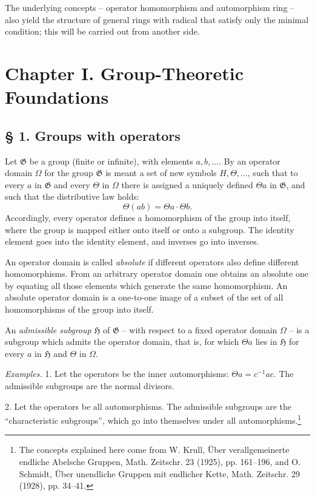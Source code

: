 \documentclass[11pt]{article}
\providecommand{\mG}{\mathfrak{G}}
\providecommand{\mH}{\mathfrak{H}}
\begin{document}
The underlying concepts -- operator homomorphism and automorphism ring -- also yield the structure of general rings with radical that satisfy only the minimal condition; this will be carried out from another side.

\section*{Chapter I. Group-Theoretic Foundations}

\subsection*{§ 1. Groups with operators}

Let $\mG$ be a group (finite or infinite), with elements $a,b,\ldots$. By an operator domain $\Omega$ for the group $\mG$ is meant a set of new symbols $H,\Theta,\ldots$, such that to every $a$ in $\mG$ and every $\Theta$ in $\Omega$ there is assigned a uniquely defined $\Theta a$ in $\mG$, and such that the distributive law holds:
\[
        \Theta(ab)=\Theta a\cdot\Theta b.
\]
Accordingly, every operator defines a homomorphism of the group into itself, where the group is mapped either onto itself or onto a subgroup. The identity element goes into the identity element, and inverses go into inverses.

An operator domain is called \emph{absolute} if different operators also define different homomorphisms. From an arbitrary operator domain one obtains an absolute one by equating all those elements which generate the same homomorphism. An absolute operator domain is a one-to-one image of a subset of the set of all homomorphisms of the group into itself.

An \emph{admissible subgroup} $\mH$ of $\mG$ -- with respect to a fixed operator domain $\Omega$ -- is a subgroup which admits the operator domain, that is, for which $\Theta a$ lies in $\mH$ for every $a$ in $\mH$ and $\Theta$ in $\Omega$.

\emph{Examples.} 1. Let the operators be the inner automorphisms: $\Theta a=c^{-1}ac$. The admissible subgroups are the normal divisors.

2. Let the operators be all automorphisms. The admissible subgroups are the ``characteristic subgroups'', which go into themselves under all automorphisms.\footnote{The concepts explained here come from W. Krull, Über verallgemeinerte endliche Abelsche Gruppen, Math. Zeitschr. 23 (1925), pp. 161--196, and O. Schmidt, Über unendliche Gruppen mit endlicher Kette, Math. Zeitschr. 29 (1928), pp. 34--41.}
\end{document}
